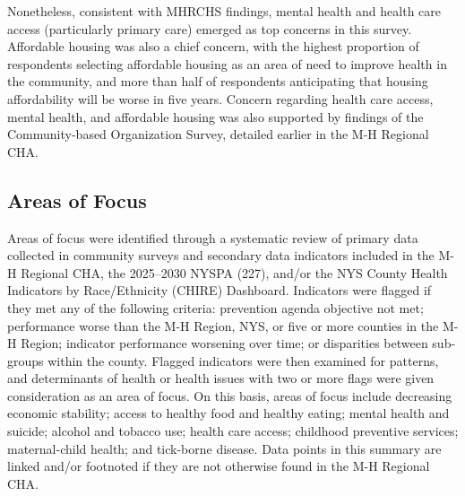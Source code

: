 \documentclass[
  english,
  letterpaper,
]{report}
\begin{document}
Nonetheless, consistent with MHRCHS findings, mental health and health
care access (particularly primary care) emerged as top concerns in this
survey. Affordable housing was also a chief concern, with the highest
proportion of respondents selecting affordable housing as an area of
need to improve health in the community, and more than half of
respondents anticipating that housing affordability will be worse in
five years. Concern regarding health care access, mental health, and
affordable housing was also supported by findings of the Community-based
Organization Survey, detailed earlier in the M-H Regional CHA.

\subsection{Areas of Focus}\label{areas-of-focus-2}

Areas of focus were identified through a systematic review of primary
data collected in community surveys and secondary data indicators
included in the M-H Regional CHA, the 2025--2030 NYSPA (227), and/or the
NYS County Health Indicators by Race/Ethnicity (CHIRE) Dashboard.
Indicators were flagged if they met any of the following criteria:
prevention agenda objective not met; performance worse than the M-H
Region, NYS, or five or more counties in the M-H Region; indicator
performance worsening over time; or disparities between sub-groups
within the county. Flagged indicators were then examined for patterns,
and determinants of health or health issues with two or more flags were
given consideration as an area of focus. On this basis, areas of focus
include decreasing economic stability; access to healthy food and
healthy eating; mental health and suicide; alcohol and tobacco use;
health care access; childhood preventive services; maternal-child
health; and tick-borne disease. Data points in this summary are linked
and/or footnoted if they are not otherwise found in the M-H Regional
CHA.
\end{document}
